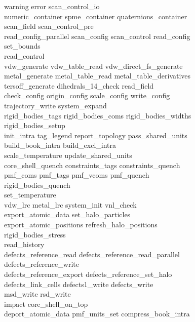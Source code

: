 \begin{itemize}
{\sc
warning error scan\_control\_io \\
numeric\_container spme\_container quaternions\_container \\
scan\_field scan\_control\_pre \\
read\_config\_parallel scan\_config scan\_control read\_config \\
set\_bounds \\
read\_control \\
vdw\_generate vdw\_table\_read vdw\_direct\_fs\_generate \\
metal\_generate metal\_table\_read metal\_table\_derivatives \\
tersoff\_generate dihedrals\_14\_check read\_field \\
check\_config origin\_config scale\_config write\_config \\
trajectory\_write system\_expand \\
rigid\_bodies\_tags rigid\_bodies\_coms rigid\_bodies\_widths \\
rigid\_bodies\_setup \\
init\_intra tag\_legend report\_topology pass\_shared\_units \\
build\_book\_intra build\_excl\_intra \\
scale\_temperature update\_shared\_units \\
core\_shell\_quench constraints\_tags constraints\_quench \\
pmf\_coms pmf\_tags pmf\_vcoms pmf\_quench \\
rigid\_bodies\_quench \\
set\_temperature \\
vdw\_lrc metal\_lrc system\_init vnl\_check \\
export\_atomic\_data set\_halo\_particles \\
export\_atomic\_positions refresh\_halo\_positions \\
rigid\_bodies\_stress \\
read\_history \\
defects\_reference\_read defects\_reference\_read\_parallel \\
defects\_reference\_write \\
defects\_reference\_export defects\_reference\_set\_halo \\
defects\_link\_cells defects1\_write defects\_write \\
msd\_write rsd\_write \\
impact core\_shell\_on\_top \\
deport\_atomic\_data pmf\_units\_set compress\_book\_intra \\
}
\end{itemize}
